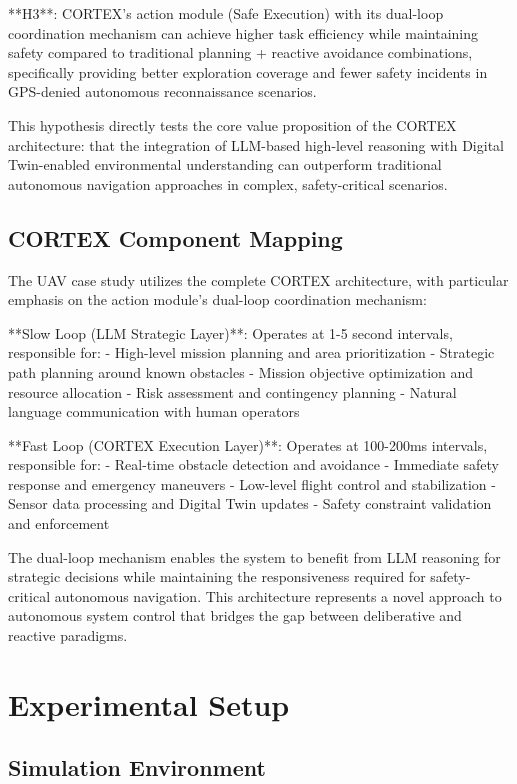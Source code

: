 **H3**: CORTEX's action module (Safe Execution) with its dual-loop coordination mechanism can achieve higher task efficiency while maintaining safety compared to traditional planning + reactive avoidance combinations, specifically providing better exploration coverage and fewer safety incidents in GPS-denied autonomous reconnaissance scenarios.

This hypothesis directly tests the core value proposition of the CORTEX architecture: that the integration of LLM-based high-level reasoning with Digital Twin-enabled environmental understanding can outperform traditional autonomous navigation approaches in complex, safety-critical scenarios.

\subsection{CORTEX Component Mapping}

The UAV case study utilizes the complete CORTEX architecture, with particular emphasis on the action module's dual-loop coordination mechanism:

**Slow Loop (LLM Strategic Layer)**: Operates at 1-5 second intervals, responsible for:
- High-level mission planning and area prioritization
- Strategic path planning around known obstacles
- Mission objective optimization and resource allocation
- Risk assessment and contingency planning
- Natural language communication with human operators

**Fast Loop (CORTEX Execution Layer)**: Operates at 100-200ms intervals, responsible for:
- Real-time obstacle detection and avoidance
- Immediate safety response and emergency maneuvers
- Low-level flight control and stabilization
- Sensor data processing and Digital Twin updates
- Safety constraint validation and enforcement

The dual-loop mechanism enables the system to benefit from LLM reasoning for strategic decisions while maintaining the responsiveness required for safety-critical autonomous navigation. This architecture represents a novel approach to autonomous system control that bridges the gap between deliberative and reactive paradigms.

\section{Experimental Setup}

\subsection{Simulation Environment}

